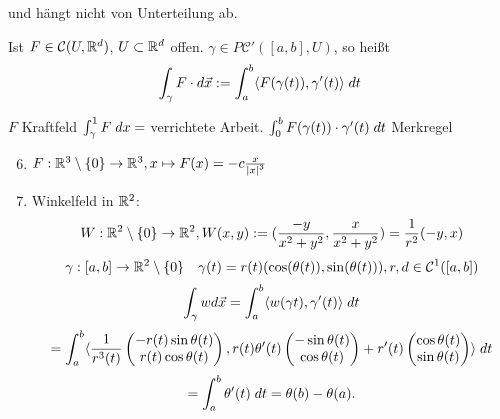 \documentclass[../ana2.tex]{subfiles}
\begin{document}
und hängt nicht von Unterteilung ab.
\begin{defi}[Linienintegral]
    Ist \( F \in \mathcal{C}(U, \R^d) \), \(U \subset \R^d\) offen. 
    \( \gamma \in P\mathcal{C}'([a,b], U) \), so heißt 
    \[ \int_\gamma F\cdot d \vec{x} 
    := \integralx{\scalarprod{ F(\gamma(t)) }{ \gamma'(t) } }{a}{b}{t} \]
\end{defi}
\(F\) Kraftfeld \(\integral{F}{\gamma}{1} = \) verrichtete Arbeit.
\(\integralx{F(\gamma(t))\cdot \gamma'(t)}{0}{b}{t}\) Merkregel
\begin{bsp}\leavevmode
    \begin{enumerate}
        \setcounter{enumi}{5}
        \item \( \abb{F}{\R^3 \setminus \set{0}}{\R^3}, x \mapsto F(x) = -c \frac{x}{\abs{x}^3} \)
        \item Winkelfeld in \( \R^2 \): 
        \[ \abb{W}{\R^2 \setminus \set{0}}{\R^2}, W(x,y) 
        := (\frac{-y}{x^2 + y^2} , \frac{x}{x^2 + y^2}) 
        = \frac{1}{r^2} (-y, x) \]
        \[ \abb{\gamma}{[a,b]}{\R^2 \setminus \set{0}} \quad 
        \gamma(t) = r(t) (\cos(\theta(t)), \sin(\theta(t))), r, d \in \mathcal{C}^1([a,b]) \]
        \[ \int_\gamma w d \vec{x} = \integralx{\scalarprod{w(\gamma{t})}{\gamma'(t)}}{a}{b}{t} \]
        \[ = \integralx{\scalarprod{\frac{1}{r^3(t)} \begin{pmatrix}
            -r(t) \sin \theta(t) \\
            r(t) \cos \theta(t)
        \end{pmatrix}}{r(t)\theta'(t) \begin{pmatrix}
            -\sin \theta(t) \\
            \cos \theta(t)
        \end{pmatrix} + r'(t) \begin{pmatrix}
            \cos \theta(t) \\
            \sin \theta(t)
        \end{pmatrix}}}{a}{b}{t} \]
        \[ = \integralx{\theta'(t)}{a}{b}{t} = \theta(b) - \theta(a). \]
    \end{enumerate}
\end{bsp}
\end{document}
